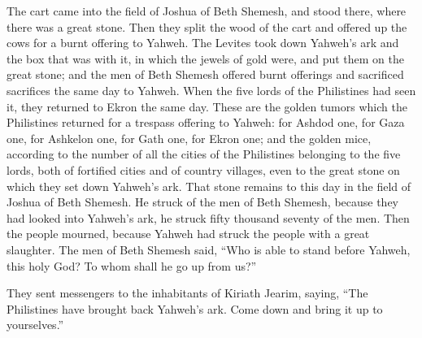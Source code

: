 {The cart came into the field of Joshua of Beth Shemesh, and stood there, where there was a great stone. Then they split the wood of the cart and offered up the cows for a burnt offering to Yahweh.
The Levites took down Yahweh’s ark and the box that was with it, in which the jewels of gold were, and put them on the great stone; and the men of Beth Shemesh offered burnt offerings and sacrificed sacrifices the same day to Yahweh.
When the five lords of the Philistines had seen it, they returned to Ekron the same day.
These are the golden tumors which the Philistines returned for a trespass offering to Yahweh: for Ashdod one, for Gaza one, for Ashkelon one, for Gath one, for Ekron one;
and the golden mice, according to the number of all the cities of the Philistines belonging to the five lords, both of fortified cities and of country villages, even to the great stone on which they set down Yahweh’s ark. That stone remains to this day in the field of Joshua of Beth Shemesh.
He struck of the men of Beth Shemesh, because they had looked into Yahweh’s ark, he struck fifty thousand seventy of the men. Then the people mourned, because Yahweh had struck the people with a great slaughter.
The men of Beth Shemesh said, “Who is able to stand before Yahweh, this holy God? To whom shall he go up from us?”
\par }{\PP {}They sent messengers to the inhabitants of Kiriath Jearim, saying, “The Philistines have brought back Yahweh’s ark. Come down and bring it up to yourselves.”

}
